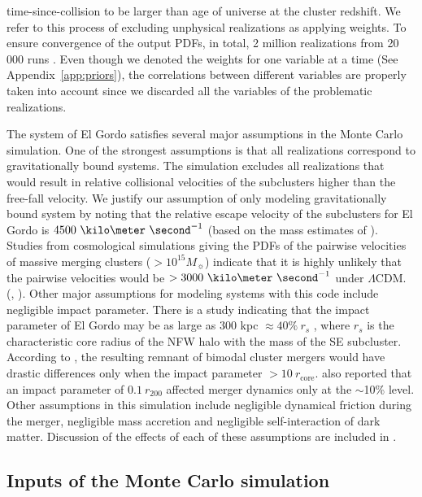 time-since-collision to be larger than age of universe at the
cluster redshift.  We refer to this process of excluding unphysical
realizations as applying weights. 
To ensure convergence of the output PDFs, in total, 2 million realizations
from 20 000 runs . 
Even though we denoted the weights for one variable at a time (See Appendix~\ref{app:priors}), 
the correlations between different variables are properly taken into account
since we discarded all the variables of the problematic
realizations.\par 
The system of El Gordo satisfies several major assumptions in the Monte Carlo
simulation. One of the strongest assumptions is that all realizations correspond to
gravitationally bound systems. The simulation excludes all realizations
that would result in relative collisional velocities of the subclusters
higher than the free-fall velocity. We justify our assumption of only
modeling gravitationally bound system by noting that the relative escape
velocity of the subclusters for El Gordo is
$4500~\kilo\meter~\second^{-1}$ (based on the mass estimates of
\cite{Jee13}). Studies from cosmological simulations giving the PDFs of the pairwise velocities of massive merging clusters ($>
10^{15} M_{\sun}$) indicate that it is highly unlikely that the pairwise
velocities would be $> 3000~\kilo \meter~\second^{-1}$ under $\Lambda$CDM.
(\citealt{Thompson12}, \citealt{Lee2010}).  Other major assumptions for
modeling systems with this code include negligible impact parameter. There
is a study indicating that the impact parameter of El Gordo
may be as large as $300$ kpc $ \approx 40\%~r_s$ \citep{Molnar14},
where $r_s$ is the characteristic core
radius of the NFW halo with the mass of the SE subcluster. According to
\cite{Ricker98}, the resulting remnant of bimodal cluster mergers would
have drastic differences only when the impact parameter $> 10~ r_{\text{core}}$.
\cite{Mastropietro2008a} also reported that an impact parameter of $0.1~
r_{200}$ affected merger dynamics only at the $\sim$10\% level.   
Other assumptions in this simulation include negligible dynamical friction
during the merger, negligible mass accretion and negligible self-interaction
of dark matter. Discussion of the effects of each of these assumptions are
included in .  
\par
\subsection{Inputs of the Monte Carlo simulation} \label{sec: inputs}
\setcounter{table}{0} 

